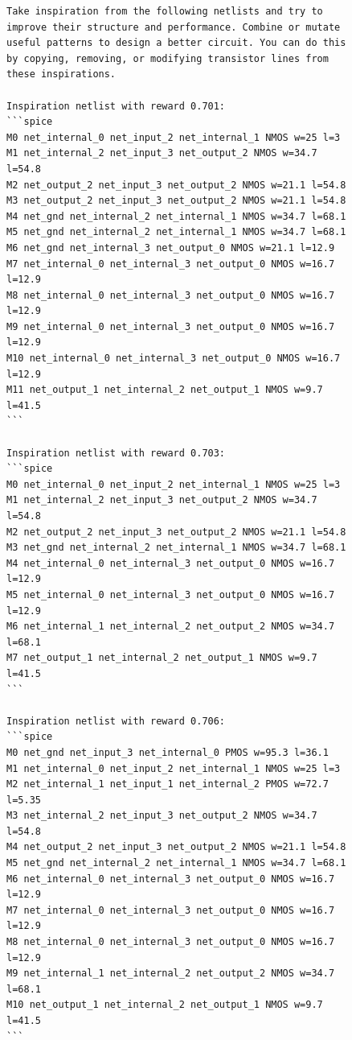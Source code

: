 \documentclass[sigconf,pbalance]{acmart_modified}
\begin{document}
\begin{figure}
\begin{minipage}[t]{0.54\textwidth}
\begin{prompt}
\begin{Verbatim}[breaklines=true,breaksymbolleft={},commandchars=\\\{\}]
Take inspiration from the following netlists and try to improve their structure and performance. Combine or mutate useful patterns to design a better circuit. You can do this by copying, removing, or modifying transistor lines from these inspirations.

Inspiration netlist with reward 0.701:
```spice
M0 net_internal_0 net_input_2 net_internal_1 NMOS w=25 l=3
M1 net_internal_2 net_input_3 net_output_2 NMOS w=34.7 l=54.8
M2 net_output_2 net_input_3 net_output_2 NMOS w=21.1 l=54.8
M3 net_output_2 net_input_3 net_output_2 NMOS w=21.1 l=54.8
M4 net_gnd net_internal_2 net_internal_1 NMOS w=34.7 l=68.1
M5 net_gnd net_internal_2 net_internal_1 NMOS w=34.7 l=68.1
M6 net_gnd net_internal_3 net_output_0 NMOS w=21.1 l=12.9
M7 net_internal_0 net_internal_3 net_output_0 NMOS w=16.7 l=12.9
M8 net_internal_0 net_internal_3 net_output_0 NMOS w=16.7 l=12.9
M9 net_internal_0 net_internal_3 net_output_0 NMOS w=16.7 l=12.9
M10 net_internal_0 net_internal_3 net_output_0 NMOS w=16.7 l=12.9
M11 net_output_1 net_internal_2 net_output_1 NMOS w=9.7 l=41.5
```

Inspiration netlist with reward 0.703:
```spice
M0 net_internal_0 net_input_2 net_internal_1 NMOS w=25 l=3
M1 net_internal_2 net_input_3 net_output_2 NMOS w=34.7 l=54.8
M2 net_output_2 net_input_3 net_output_2 NMOS w=21.1 l=54.8
M3 net_gnd net_internal_2 net_internal_1 NMOS w=34.7 l=68.1
M4 net_internal_0 net_internal_3 net_output_0 NMOS w=16.7 l=12.9
M5 net_internal_0 net_internal_3 net_output_0 NMOS w=16.7 l=12.9
M6 net_internal_1 net_internal_2 net_output_2 NMOS w=34.7 l=68.1
M7 net_output_1 net_internal_2 net_output_1 NMOS w=9.7 l=41.5
```

Inspiration netlist with reward 0.706:
```spice
M0 net_gnd net_input_3 net_internal_0 PMOS w=95.3 l=36.1
M1 net_internal_0 net_input_2 net_internal_1 NMOS w=25 l=3
M2 net_internal_1 net_input_1 net_internal_2 PMOS w=72.7 l=5.35
M3 net_internal_2 net_input_3 net_output_2 NMOS w=34.7 l=54.8
M4 net_output_2 net_input_3 net_output_2 NMOS w=21.1 l=54.8
M5 net_gnd net_internal_2 net_internal_1 NMOS w=34.7 l=68.1
M6 net_internal_0 net_internal_3 net_output_0 NMOS w=16.7 l=12.9
M7 net_internal_0 net_internal_3 net_output_0 NMOS w=16.7 l=12.9
M8 net_internal_0 net_internal_3 net_output_0 NMOS w=16.7 l=12.9
M9 net_internal_1 net_internal_2 net_output_2 NMOS w=34.7 l=68.1
M10 net_output_1 net_internal_2 net_output_1 NMOS w=9.7 l=41.5
```


\end{Verbatim}
\end{prompt}
\end{minipage}
\end{figure}
\end{document}
